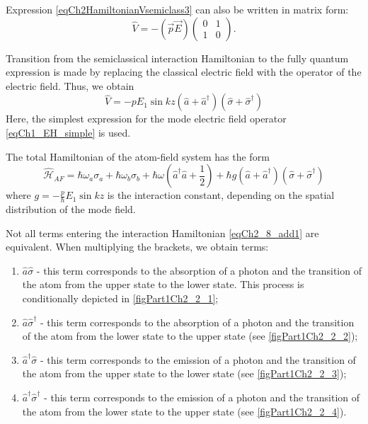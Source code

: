 Expression \eqref{eqCh2HamiltonianVsemiclass3} can also be
written in matrix form:
\begin{equation}
\hat{V} = - \left(\vec{p} \vec{E}\right)
\left(
\begin{array} {cc}
0 & 1  
\\
1 & 0 
\end{array}
\right).
\label{eqCh2_8}
\end{equation}

Transition from the semiclassical interaction Hamiltonian to the fully
quantum expression is made by replacing the classical
electric field with the operator of the electric field. Thus, we obtain 
\begin{equation}
\hat{V} = - p E_1 \sin k z \left(\hat{a} + \hat{a}^{\dag}\right)
\left(\hat{\sigma} + \hat{\sigma}^{\dag}\right)
\label{eqCh2_8_add1}
\end{equation}
Here, the simplest expression for the mode electric field operator \eqref{eqCh1_EH_simple} is used.

The total Hamiltonian of the atom-field system has the form
\begin{equation}
\hat{\mathcal{H}}_{AF} = 
\hbar \omega_a \sigma_a + \hbar \omega_b \sigma_b +
\hbar \omega 
\left(\hat{a}^{\dag}\hat{a} + \frac{1}{2}\right)
+ \hbar g \left(\hat{a} + \hat{a}^{\dag}\right)
\left(\hat{\sigma} + \hat{\sigma}^{\dag}\right)
\nonumber
\end{equation}
where $g = -\frac{p}{\hbar}E_1 \sin k z$ is the interaction constant,
depending on the spatial distribution of the mode field.  










Not all terms entering the interaction Hamiltonian
\eqref{eqCh2_8_add1} are equivalent. When multiplying the brackets, we obtain
terms: 
\begin{enumerate}
\item $\hat{a}\hat{\sigma}$ - this term corresponds to the absorption of
  a photon and the transition of the atom from the upper state to the lower state. This process is conditionally depicted in \autoref{figPart1Ch2_2_1};  
\item $\hat{a}\hat{\sigma}^{\dag}$ - this term corresponds to the absorption
  of a photon and the transition of the atom from the lower state to the upper state (see \autoref{figPart1Ch2_2_2});  
\item $\hat{a}^{\dag}\hat{\sigma}$ - this term corresponds to the emission
  of a photon and the transition of the atom from the upper state to the lower state (see \autoref{figPart1Ch2_2_3}); 
\item $\hat{a}^{\dag}\hat{\sigma}^{\dag}$ - this term corresponds to
  the emission of a photon and the transition of the atom from the lower state to the upper state (see \autoref{figPart1Ch2_2_4}). 
\end{enumerate}


